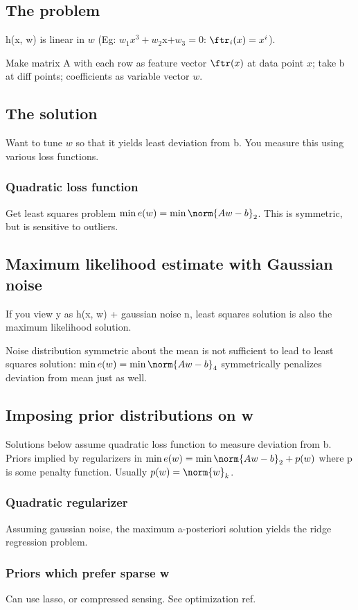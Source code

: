 \documentclass[oneside, article]{memoir}
\begin{document}
\subsection{The problem}
h(x, w) is linear in $w$ (Eg: $w_1 x^{3}+ w_2 $x$ + w_3=0$: $\ftr_{i}(x) = x^{i}$).

Make matrix A with each row as feature vector $\ftr(x)$ at data point $x$; take b at diff points; coefficients as variable vector $w$.

\subsection{The solution}
Want to tune $w$ so that it yields least deviation from b. You measure this using various loss functions.

\subsubsection{Quadratic loss function}
Get least squares problem $\min e(w) = \min \norm{Aw - b}_{2}$. This is symmetric, but is sensitive to outliers.

\subsection{Maximum likelihood estimate with Gaussian noise}
If you view y as h(x, w) + gaussian noise n, least squares solution is also the maximum likelihood solution.

Noise distribution symmetric about the mean is not sufficient to lead to least squares solution: $\min e(w) = \min \norm{Aw - b}_{4}$ symmetrically penalizes deviation from mean just as well.

\subsection{Imposing prior distributions on w}
Solutions below assume quadratic loss function to measure deviation from b. Priors implied by regularizers in $\min e(w) = \min \norm{Aw - b}_{2} + p(w)$ where p is some penalty function. Usually $p(w) = \norm{w}_{k}$.

\subsubsection{Quadratic regularizer}
Assuming gaussian noise, the maximum a-posteriori solution yields the ridge regression problem.

\subsubsection{Priors which prefer sparse w}
Can use lasso, or compressed sensing. See optimization ref.
\end{document}
